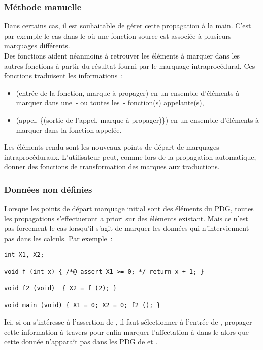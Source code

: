 \subsubsection{Méthode manuelle}

Dans certains cas, il est souhaitable de gérer cette propagation à la main.
C'est par exemple le cas dans le \slicing{} où une fonction source est associée
à plusieurs marquages différents.\\

Des fonctions aident néanmoins à retrouver les éléments à marquer dans les
autres fonctions à partir du résultat fourni par le marquage intraprocédural.
Ces fonctions traduisent les informations~:
\begin{itemize}
  \item (entrée de la fonction, marque à propager) en un ensemble d'éléments à
    marquer dans une~- ou toutes les~- fonction(s) appelante(s),
  \item (appel, \{(sortie de l'appel, marque à propager)\})
    en un ensemble d'éléments à marquer dans la fonction appelée.
\end{itemize}
Les éléments rendu sont les nouveaux points de départ de marquages
intraprocéduraux.
L'utilisateur peut, comme lors de la propagation automatique,
donner des fonctions de transformation des marques aux traductions.

\subsubsection{Données non définies}

Lorsque les points de départ marquage initial sont des éléments du PDG,
toutes les propagations s'effectueront a priori sur des éléments existant.
Mais ce n'est pas forcement le cas lorsqu'il s'agit de marquer les données
qui n'interviennent pas dans les calculs. Par exemple~:

\begin{exemple}
  \begin{verbatim}
int X1, X2;

void f (int x) { /*@ assert X1 >= 0; */ return x + 1; }

void f2 (void)  { X2 = f (2); }

void main (void) { X1 = 0; X2 = 0; f2 (); }
  \end{verbatim}

  Ici, si on s'intéresse à l'assertion de , il faut sélectionner
   à l'entrée de , propager cette information à travers
   pour enfin marquer l'affectation à  dans le 
  alors que cette donnée n'apparaît pas dans les PDG de  et .
\end{exemple}

